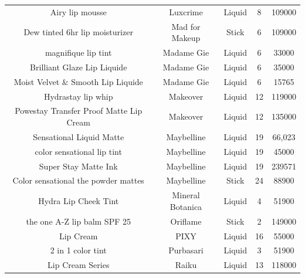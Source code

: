 \documentclass{article}
\begin{document}
\begin{longtable}{ccccc}
    Airy lip mousse                         & Luxcrime          & Liquid                       & 8               & 109000         \\
    Dew tinted 6hr lip moisturizer          & Mad for Makeup    & Stick                        & 6               & 109000         \\
    magnifique lip tint                     & Madame Gie        & Liquid                       & 6               & 33000          \\
    Brilliant Glaze Lip Liquide             & Madame Gie        & Liquid                       & 6               & 35000          \\
    Moist Velvet \& Smooth Lip Liquide      & Madame Gie        & Liquid                       & 6               & 15765          \\
    Hydrastay lip whip                      & Makeover          & Liquid                       & 12              & 119000         \\
    Powestay Transfer Proof Matte Lip Cream & Makeover          & Liquid                       & 12              & 135000         \\
    Sensational Liquid Matte                & Maybelline        & Liquid                       & 19              & 66,023         \\
    color sensational lip tint              & Maybelline        & Liquid                       & 19              & 45000          \\
    Super Stay Matte Ink                    & Maybelline        & Liquid                       & 19              & 239571         \\
    Color sensational the powder mattes     & Maybelline        & Stick                        & 24              & 88900          \\
    Hydra Lip Cheek Tint                    & Mineral Botanica  & Liquid                       & 4               & 51900          \\
    the one A-Z lip balm SPF 25             & Oriflame          & Stick                        & 2               & 149000         \\
    Lip Cream                               & PIXY              & Liquid                       & 16              & 55000          \\
    2 in 1 color tint                       & Purbasari         & Liquid                       & 3               & 51900          \\
    Lip Cream Series                        & Raiku             & Liquid                       & 13              & 118000         \\

\end{longtable}
\end{document}
